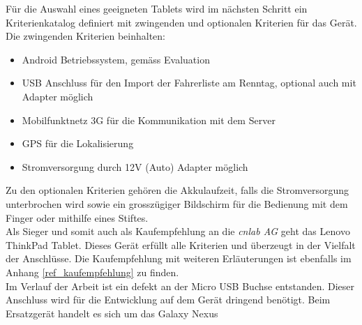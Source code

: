 Für die Auswahl eines geeigneten Tablets wird im nächsten Schritt ein Kriterienkatalog definiert mit zwingenden und optionalen Kriterien für das Gerät. Die zwingenden Kriterien beinhalten:
\begin{itemize}
\item Android Betriebssystem, gemäss Evaluation
\item USB Anschluss für den Import der Fahrerliste am Renntag, optional auch mit Adapter möglich
\item Mobilfunktnetz 3G für die Kommunikation mit dem Server
\item GPS für die Lokalisierung
\item Stromversorgung durch 12V (Auto) Adapter möglich
\end{itemize}
Zu den optionalen Kriterien gehören die Akkulaufzeit, falls die Stromversorgung unterbrochen wird sowie ein grosszügiger Bildschirm für die Bedienung mit dem Finger oder mithilfe eines Stiftes.
\\

Als Sieger und somit auch als Kaufempfehlung an die \textit{cnlab AG} geht das Lenovo ThinkPad Tablet. Dieses Gerät erfüllt alle Kriterien und überzeugt in der Vielfalt der Anschlüsse. Die Kaufempfehlung mit weiteren Erläuterungen ist ebenfalls im Anhang \ref{ref_kaufempfehlung} zu finden.
\\

Im Verlauf der Arbeit ist ein defekt an der Micro USB Buchse entstanden. Dieser Anschluss wird für die Entwicklung auf dem Gerät dringend benötigt. Beim Ersatzgerät handelt es sich um das Galaxy Nexus 
